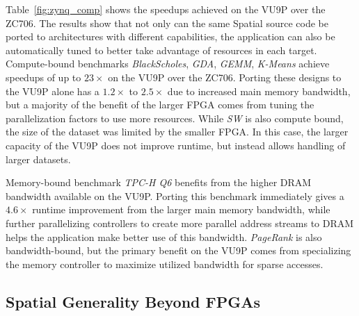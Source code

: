 Table~\ref{fig:zynq_comp} shows the speedups achieved on the VU9P over the ZC706. The results show that not only can the same Spatial source code be ported
to architectures with different capabilities, the application can also be automatically tuned to better take advantage of resources in each target.
Compute-bound benchmarks \emph{BlackScholes}, \emph{GDA}, \emph{GEMM}, \emph{K-Means} achieve speedups of up to $23\times$ on the VU9P over the ZC706. Porting these designs to the VU9P alone has a $1.2\times$ to $2.5\times$ due to increased main memory bandwidth, but a majority of the benefit of the larger FPGA comes from tuning the parallelization factors to use more resources.
While \emph{SW} is also compute bound, the size of the dataset was limited by the smaller FPGA. In this case, the larger capacity of the VU9P does not improve runtime, but instead allows handling of larger datasets.

Memory-bound benchmark \emph{TPC-H Q6} benefits from the higher DRAM bandwidth available on the VU9P. Porting this benchmark immediately gives a $4.6\times$ runtime improvement from the larger main memory bandwidth, while further parallelizing controllers to create more parallel address streams to DRAM helps the application make better use of this bandwidth. \emph{PageRank} is also bandwidth-bound, but the primary benefit on the VU9P comes from specializing the memory controller to maximize utilized bandwidth for sparse accesses.




\subsection{Spatial Generality Beyond FPGAs}


